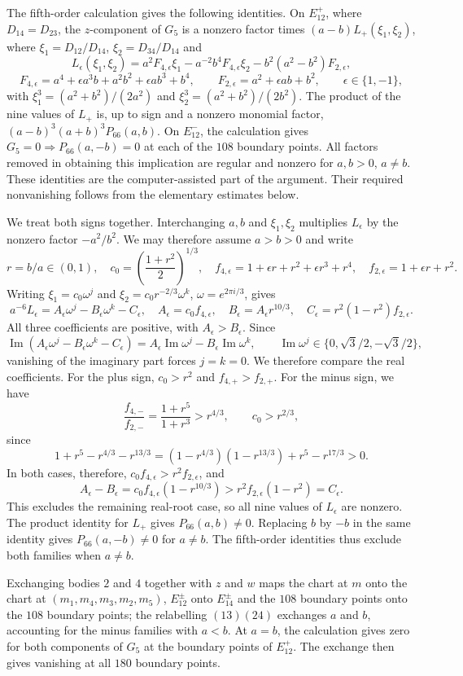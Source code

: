 \documentclass[Threeside,11pt]{article}
\theoremstyle{definition}
\theoremstyle{remark}
\numberwithin{equation}{section}
\theoremstyle{remark}
\begin{document}
{The fifth-order calculation gives the following identities. On $E^+_{12}$,
where $D_{14}=D_{23}$, the $z$-component of $G_5$ is a nonzero factor times
$(a-b)L_+(\xi_1,\xi_2)$, where $\xi_1=D_{12}/D_{14}$,
$\xi_2=D_{34}/D_{14}$ and
\[
 L_\epsilon(\xi_1,\xi_2)
 =a^2F_{4,\epsilon}\xi_1-a^{-2}b^4F_{4,\epsilon}\xi_2
       -b^2(a^2-b^2)F_{2,\epsilon},
\]
\[
 F_{4,\epsilon}=a^4+\epsilon a^3b+a^2b^2+\epsilon ab^3+b^4,
 \qquad F_{2,\epsilon}=a^2+\epsilon ab+b^2,
 \qquad \epsilon\in\{1,-1\},
\]
with $\xi_1^3=(a^2+b^2)/(2a^2)$ and
$\xi_2^3=(a^2+b^2)/(2b^2)$.
The product of the nine values of $L_+$ is, up to sign and a nonzero monomial
factor, $(a-b)^3(a+b)^3P_{66}(a,b)$.
On $E^-_{12}$, the calculation gives $G_5=0\Rightarrow P_{66}(a,-b)=0$
at each of the $108$ boundary points. All factors removed in obtaining this implication
are regular and nonzero for $a,b>0$, $a\ne b$.
These identities are the computer-assisted part of the argument.
Their required nonvanishing follows from the elementary estimates below.

We treat both signs together. Interchanging $a,b$ and $\xi_1,\xi_2$ multiplies $L_\epsilon$
by the nonzero factor $-a^2/b^2$. We may therefore assume $a>b>0$ and write
\[
 r=b/a\in(0,1),\quad c_0=\left(\frac{1+r^2}{2}\right)^{1/3},\quad
 f_{4,\epsilon}=1+\epsilon r+r^2+\epsilon r^3+r^4,\quad
 f_{2,\epsilon}=1+\epsilon r+r^2.
\]
Writing $\xi_1=c_0\omega^j$ and $\xi_2=c_0r^{-2/3}\omega^k$,
$\omega=e^{2\pi i/3}$, gives
\[
 a^{-6}L_\epsilon=A_\epsilon\omega^j-B_\epsilon\omega^k-C_\epsilon,
 \quad A_\epsilon=c_0f_{4,\epsilon},\quad
 B_\epsilon=A_\epsilon r^{10/3},\quad
 C_\epsilon=r^2(1-r^2)f_{2,\epsilon}.
\]
All three coefficients are positive, with $A_\epsilon>B_\epsilon$. Since
\[
 \operatorname{Im}(A_\epsilon\omega^j-B_\epsilon\omega^k-C_\epsilon)
   =A_\epsilon\operatorname{Im}\omega^j-B_\epsilon\operatorname{Im}\omega^k,
 \qquad \operatorname{Im}\omega^j\in\{0,\sqrt3/2,-\sqrt3/2\},
\]
vanishing of the imaginary part forces $j=k=0$. We therefore compare the real
coefficients. For the plus sign, $c_0>r^2$ and
$f_{4,+}>f_{2,+}$. For the minus sign, we have
\[
 \frac{f_{4,-}}{f_{2,-}}=\frac{1+r^5}{1+r^3}>r^{4/3},\qquad c_0>r^{2/3},
\]
since
\[
 1+r^5-r^{4/3}-r^{13/3}
 =(1-r^{4/3})(1-r^{13/3})+r^5-r^{17/3}>0.
\]
In both cases, therefore, $c_0f_{4,\epsilon}>r^2f_{2,\epsilon}$, and
\[
 A_\epsilon-B_\epsilon
 =c_0f_{4,\epsilon}(1-r^{10/3})
 >r^2f_{2,\epsilon}(1-r^2)=C_\epsilon.
\]
This excludes the remaining real-root case, so all nine values of $L_\epsilon$ are nonzero.
The product identity for $L_+$ gives $P_{66}(a,b)\ne0$.
Replacing $b$ by $-b$ in the same identity gives $P_{66}(a,-b)\ne0$ for $a\ne b$.
The fifth-order identities thus exclude both families when $a\ne b$.

}
{Exchanging bodies $2$ and $4$ together with $z$ and
$w$ maps the chart at $m$ onto the chart at $(m_1,m_4,m_3,m_2,m_5)$, $E^\pm_{12}$ onto
$E^\pm_{14}$ and the $108$ boundary points onto the $108$ boundary points; the relabelling $(13)(24)$ exchanges $a$
and $b$, accounting for the minus families with $a<b$.
At $a=b$, the calculation gives zero for both components of $G_5$ at the boundary points of $E^+_{12}$.
The exchange then gives vanishing at all $180$ boundary points.}
\end{document}
